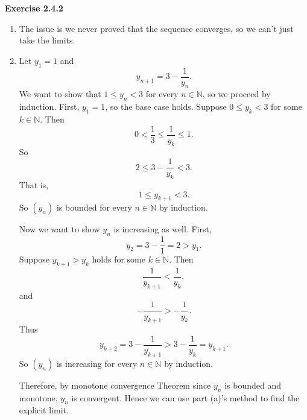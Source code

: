 \documentclass[12pt]{article}
\begin{document}
\textbf{Exercise 2.4.2}
\begin{enumerate}[label=(\alph*)]
    \item The issue is we never proved that the sequence converges, so we can't just take the limits.
    \item Let \( y_1 = 1 \) and
          \[
              y_{n+1} = 3 - \frac{1}{y_n}.
          \]
          We want to show that \( 1 \leq y_n < 3 \) for every \( n \in \mathbb{N} \), so we proceed by induction.
          First, \( y_1 = 1 \), so the base case holds.
          Suppose \( 0 \leq y_k < 3 \) for some \( k \in \mathbb{N} \).
          Then
          \[
              0 < \frac{1}{3} \leq \frac{1}{y_k} \leq 1.
          \]
          So
          \[
              2 \leq 3 - \frac{1}{y_k} < 3.
          \]
          That is,
          \[
              1 \leq y_{k+1} < 3.
          \]
          So \( (y_n) \) is bounded for every \( n \in \mathbb{N} \) by induction.

          Now we want to show \( y_n \) is increasing as well.
          First,
          \[
              y_2 = 3 - \frac{1}{1} = 2 > y_1.
          \]
          Suppose \( y_{k+1} > y_{k} \) holds for some \( k \in \mathbb{N} \).
          Then
          \[
              \frac{1}{y_{k+1}} < \frac{1}{y_k},
          \]
          and
          \[
              -\frac{1}{y_{k+1}} > -\frac{1}{y_k}.
          \]
          Thus
          \[
              y_{k+2} = 3 - \frac{1}{y_{k+1}} > 3 - \frac{1}{y_k} = y_{k+1}.
          \]
          So \( (y_n) \) is increasing for every \( n \in \mathbb{N} \) by induction.

          Therefore, by monotone convergence Theorem since \( y_n \) is bounded and monotone, \( y_n \) is convergent.
          Hence we can use part (a)'s method to find the explicit limit.
\end{enumerate}
\end{document}
